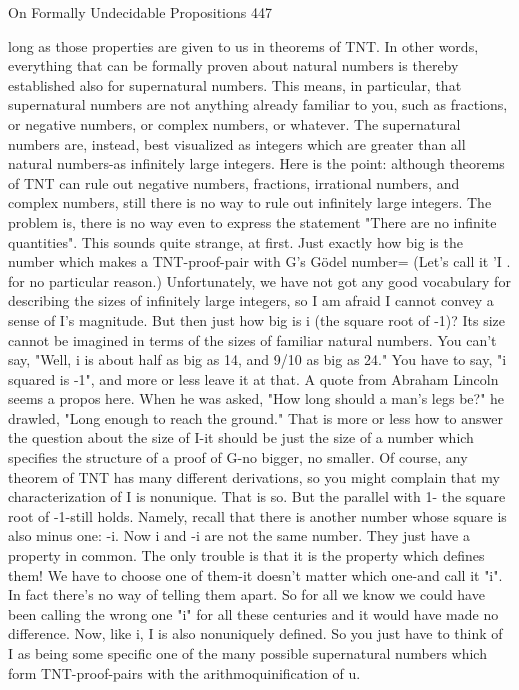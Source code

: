 On Formally Undecidable Propositions                                                    447

long as those properties are given to us in theorems of TNT. In other words, everything
that can be formally proven about natural numbers is thereby established also for
supernatural numbers. This means, in particular, that supernatural numbers are not
anything already familiar to you, such as fractions, or negative numbers, or complex
numbers, or whatever. The supernatural numbers are, instead, best visualized as integers
which are greater than all natural numbers-as infinitely large integers. Here is the point:
although theorems of TNT can rule out negative numbers, fractions, irrational numbers,
and complex numbers, still there is no way to rule out infinitely large integers. The
problem is, there is no way even to express the statement "There are no infinite
quantities".
        This sounds quite strange, at first. Just exactly how big is the number which
makes a TNT-proof-pair with G's Gödel number= (Let's call it 'I . for no particular
reason.) Unfortunately, we have not got any good vocabulary for describing the sizes of
infinitely large integers, so I am afraid I cannot convey a sense of I's magnitude. But then
just how big is i (the square root of -1)? Its size cannot be imagined in terms of the sizes
of familiar natural numbers. You can't say, "Well, i is about half as big as 14, and 9/10 as
big as 24." You have to say, "i squared is -1", and more or less leave it at that. A quote
from Abraham Lincoln seems a propos here. When he was asked, "How long should a
man's legs be?" he drawled, "Long enough to reach the ground." That is more or less how
to answer the question about the size of I-it should be just the size of a number which
specifies the structure of a proof of G-no bigger, no smaller.
        Of course, any theorem of TNT has many different derivations, so you might
complain that my characterization of I is nonunique. That is so. But the parallel with 1-
the square root of -1-still holds. Namely, recall that there is another number whose square
is also minus one: -i. Now i and -i are not the same number. They just have a property in
common. The only trouble is that it is the property which defines them! We have to
choose one of them-it doesn't matter which one-and call it "i". In fact there's no way of
telling them apart. So for all we know we could have been calling the wrong one "i" for
all these centuries and it would have made no difference. Now, like i, I is also
nonuniquely defined. So you just have to think of I as being some specific one of the
many possible supernatural numbers which form TNT-proof-pairs with the
arithmoquinification of u.


